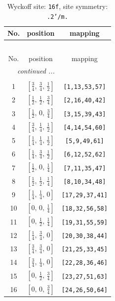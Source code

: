 \documentclass[fleqn,8pt]{jsarticle}
\begin{document}
\renewcommand{\arraystretch}{1.2}
\begin{longtable}{ccc}
\caption{Wyckoff site: {\tt 16f}, site symmetry: {\tt .2'/m.}}
 \\
 \hline \hline
No. & position & mapping \\ \hline \endfirsthead

\multicolumn{2}{l}{\tablename\ \thetable{}} \\
 \hline \hline
No. & position & mapping \\ \hline \endhead

 \hline \hline
\multicolumn{2}{r}{\footnotesize\it continued ...} \\ \endfoot

 \hline \hline
\multicolumn{2}{r}{} \\ \endlastfoot

1 & $\left[ \frac{3}{4},\, \frac{3}{4},\, \frac{1}{2} \right]$ & {\tt [1,13,53,57]} \\ \hline
2 & $\left[ \frac{1}{2},\, \frac{1}{2},\, \frac{3}{4} \right]$ & {\tt [2,16,40,42]} \\ \hline
3 & $\left[ \frac{1}{2},\, 0,\, \frac{3}{4} \right]$ & {\tt [3,15,39,43]} \\ \hline
4 & $\left[ \frac{3}{4},\, \frac{1}{4},\, \frac{1}{2} \right]$ & {\tt [4,14,54,60]} \\ \hline
5 & $\left[ \frac{1}{4},\, \frac{1}{4},\, \frac{1}{2} \right]$ & {\tt [5,9,49,61]} \\ \hline
6 & $\left[ \frac{1}{4},\, \frac{3}{4},\, \frac{1}{2} \right]$ & {\tt [6,12,52,62]} \\ \hline
7 & $\left[ \frac{1}{2},\, 0,\, \frac{1}{4} \right]$ & {\tt [7,11,35,47]} \\ \hline
8 & $\left[ \frac{1}{2},\, \frac{1}{2},\, \frac{1}{4} \right]$ & {\tt [8,10,34,48]} \\ \hline
9 & $\left[ \frac{1}{4},\, \frac{1}{4},\, 0 \right]$ & {\tt [17,29,37,41]} \\ \hline
10 & $\left[ 0,\, 0,\, \frac{1}{4} \right]$ & {\tt [18,32,56,58]} \\ \hline
11 & $\left[ 0,\, \frac{1}{2},\, \frac{1}{4} \right]$ & {\tt [19,31,55,59]} \\ \hline
12 & $\left[ \frac{1}{4},\, \frac{3}{4},\, 0 \right]$ & {\tt [20,30,38,44]} \\ \hline
13 & $\left[ \frac{3}{4},\, \frac{3}{4},\, 0 \right]$ & {\tt [21,25,33,45]} \\ \hline
14 & $\left[ \frac{3}{4},\, \frac{1}{4},\, 0 \right]$ & {\tt [22,28,36,46]} \\ \hline
15 & $\left[ 0,\, \frac{1}{2},\, \frac{3}{4} \right]$ & {\tt [23,27,51,63]} \\ \hline
16 & $\left[ 0,\, 0,\, \frac{3}{4} \right]$ & {\tt [24,26,50,64]} \\
\end{longtable}
\end{document}
